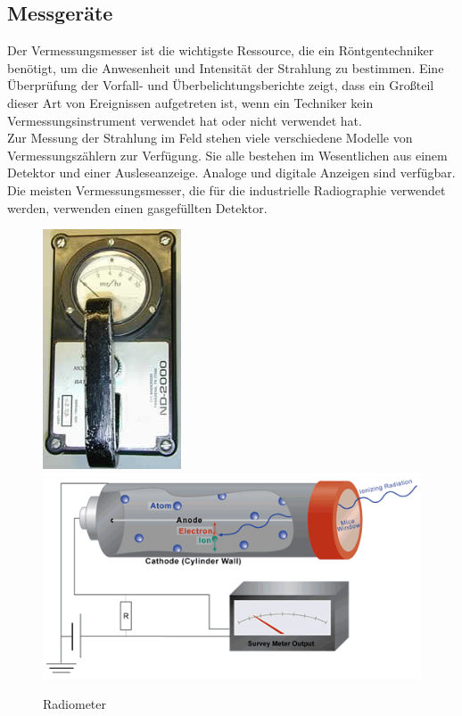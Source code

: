 {\subsection{Messgeräte}
Der Vermessungsmesser ist die wichtigste Ressource, die ein Röntgentechniker benötigt, um die Anwesenheit und Intensität der Strahlung zu bestimmen. Eine Überprüfung der Vorfall- und Überbelichtungsberichte zeigt, dass ein Großteil dieser Art von Ereignissen aufgetreten ist, wenn ein Techniker kein Vermessungsinstrument verwendet hat oder nicht verwendet hat.\\
Zur Messung der Strahlung im Feld stehen viele verschiedene Modelle von Vermessungszählern zur Verfügung. Sie alle bestehen im Wesentlichen aus einem Detektor und einer Ausleseanzeige. Analoge und digitale Anzeigen sind verfügbar. Die meisten Vermessungsmesser, die für die industrielle Radiographie verwendet werden, verwenden einen gasgefüllten Detektor.\\
\begin{figure}[htb]
  \includegraphics[scale=0.5]{img/radiometer.jpg}\\
  \includegraphics [scale=0.5]{img/radiometer_technik.png}
  \caption{Radiometer}

\end{figure}}
